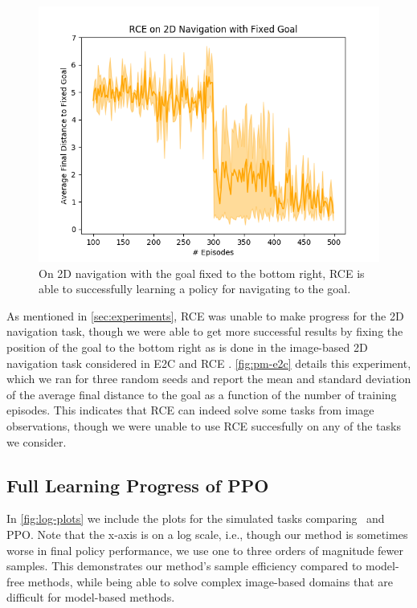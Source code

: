\begin{figure}
    \centering
    \includegraphics[width=0.8\linewidth]{img/solar/2dnav-rce.png}
    \caption{On 2D navigation with the goal fixed to the bottom right, RCE is able to successfully learning a policy for navigating to the goal.}
    \label{fig:pm-e2c}
\end{figure}

As mentioned in \autoref{sec:experiments}, RCE was unable to make progress for the 2D navigation task, though we were able to get more successful results by fixing the position of the goal to the bottom right as is done in the image-based 2D navigation task considered in E2C \citep{e2c} and RCE \citep{rce}. \autoref{fig:pm-e2c} details this experiment, which we ran for three random seeds and report the mean and standard deviation of the average final distance to the goal as a function of the number of training episodes. This indicates that RCE can indeed solve some tasks from image observations, though we were unable to use RCE succesfully on any of the tasks we consider.

\subsection{Full Learning Progress of PPO}

In \autoref{fig:log-plots} we include the plots for the simulated tasks comparing \metabbr\ and PPO. Note that the x-axis is on a log scale, i.e., though our method is sometimes worse in final policy performance, we use one to three orders of magnitude fewer samples. This demonstrates our method's sample efficiency compared to model-free methods, while being able to solve complex image-based domains that are difficult for model-based methods.


